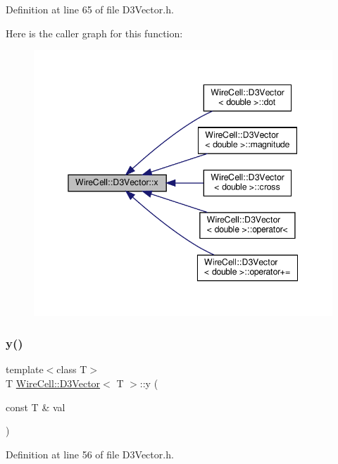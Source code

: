 Definition at line 65 of file D3\+Vector.\+h.

Here is the caller graph for this function\+:
\nopagebreak
\begin{figure}[H]
\begin{center}
\leavevmode
\includegraphics[width=345pt]{class_wire_cell_1_1_d3_vector_a65c5efb75f44d8bb1b7979151f442c09_icgraph}
\end{center}
\end{figure}
\mbox{\label{class_wire_cell_1_1_d3_vector_aa163ee62b7a8643fa374b2c4d3e3b386}} 
\subsubsection{\texorpdfstring{y()}{y()}\hspace{0.1cm}{\footnotesize\ttfamily [1/2]}}
{\footnotesize\ttfamily template$<$class T$>$ \\
T \hyperlink{class_wire_cell_1_1_d3_vector}{Wire\+Cell\+::\+D3\+Vector}$<$ T $>$\+::y (\begin{DoxyParamCaption}\item[{const T \&}]{val }\end{DoxyParamCaption})\hspace{0.3cm}{\ttfamily [inline]}}



Definition at line 56 of file D3\+Vector.\+h.

